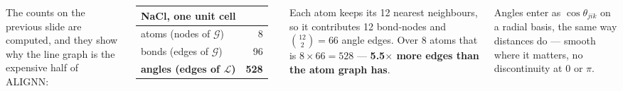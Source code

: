 \documentclass[aspectratio=169]{beamer}
\begin{document}
\begin{frame}

\begin{columns}[T]
{\sffamily\footnotesize
The counts on the previous slide are computed, and they show why the line graph
is the expensive half of ALIGNN:}

\vspace{5pt}
{\sffamily\small
\begin{tabular}{@{}lr@{}}
\toprule
NaCl, one unit cell & \\
\midrule
atoms (nodes of $\mathcal{G}$) & 8 \\
bonds (edges of $\mathcal{G}$) & 96 \\
\textbf{angles (edges of $\mathcal{L}$)} & \textbf{528} \\
\bottomrule
\end{tabular}}

\vspace{6pt}
{\sffamily\footnotesize
Each atom keeps its 12 nearest neighbours, so it contributes 12 bond-nodes and
$\binom{12}{2} = 66$ angle edges. Over 8 atoms that is $8 \times 66 = 528$ ---
\textbf{5.5$\times$ more edges than the atom graph has}.}


\vspace{5pt}
{\sffamily\scriptsize\color{Muted}
Angles enter as $\cos\theta_{jik}$ on a radial basis, the same way distances do
--- smooth where it matters, no discontinuity at $0$ or $\pi$.}
\end{columns}

\end{frame}
\end{document}
